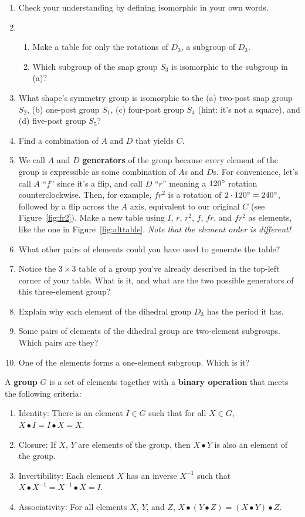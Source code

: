 \documentclass[../textbook.tex]{subfiles}
\begin{document}
\begin{enumerate}
\setcounter{enumi}{\theenumLast}
\item Check your understanding by defining isomorphic in your own words.
\item \begin{enumerate}
\item Make a table for only the rotations of $D_3$, a subgroup of $D_3$.
\item Which subgroup of the snap group $S_3$ is isomorphic to the subgroup in (a)?
\end{enumerate}
\item What shape's symmetry group is isomorphic to the (a) two-post snap group $S_2$, (b) one-post group $S_1$, (c) four-post group $S_4$ (hint: it's not a square), and (d) five-post group $S_5$? %
\item Find a combination of $A$ and $D$ that yields $C$.
\item We call $A$ and $D$ \textbf{generators} of the group because every element of the group is expressible as some combination of $A$s and $D$s. For convenience, let's call $A$ ``$f$'' since it's a flip, and call $D$ ``$r$'' meaning a $120^\circ$ rotation counterclockwise. Then, for example, $fr^2$ is a rotation of $2\cdot 120^\circ = 240^\circ$, followed by a flip across the $A$ axis, equivalent to our original $C$ (see Figure~\ref{fig:fr2}). Make a new table using $I$, $r$, $r^2$, $f$, $fr$, and $fr^2$ as elements, like the one in Figure~\ref{fig:alttable}. \textit{Note that the element order is different!} %
\item What other pairs of elements could you have used to generate the table?
\item Notice the $3\times 3$ table of a group you've already described in the top-left corner of your table. What is it, and what are the two possible generators of this three-element group?
\item Explain why each element of the dihedral group $D_3$ has the period it has.
\item Some pairs of elements of the dihedral group are two-element subgroups. Which pairs are they?
\item One of the elements forms a one-element subgroup. Which is it?
\setcounter{enumLast}{\theenumi}
\end{enumerate}
A \textbf{group} $G$ is a set of elements together with a \textbf{binary operation} that meets the following criteria:
\begin{enumerate}[label=(\alph*)]
\item Identity: There is an element $I\in G$ such that for all $X\in G$, $X\bullet I = I\bullet X = X$.
\item Closure: If $X$, $Y$ are elements of the group, then $X\bullet Y$ is also an element of the group.
\item Invertibility: Each element $X$ has an inverse $X^{-1}$ such that $X\bullet X^{-1} = X^{-1}\bullet X = I$.
\item Associativity: For all elements $X$, $Y$, and $Z$, $X\bullet (Y\bullet Z) = (X\bullet Y) \bullet Z$.
\end{enumerate}
\end{document}
